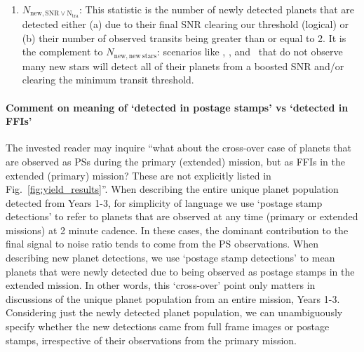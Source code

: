 \begin{enumerate}
	\item $N_\mathrm{new,SNR\lor N_{tra}}$:
	This statistic is the number of newly detected planets that are detected either (a) due to their final SNR clearing our threshold (logical) or (b) their number of observed transits being greater than or equal to 2.
	It is the complement to $N_\mathrm{new,new\ stars}$: scenarios like \nhemi, \npole, and \hemis\ that do not observe many new stars will detect all of their planets from a boosted SNR and/or clearing the minimum transit threshold.
	
\end{enumerate}

\paragraph{Comment on meaning of `detected in postage stamps' vs `detected in FFIs'}
The invested reader may inquire ``what about the cross-over case of planets that are observed as PSs during the primary (extended) mission, but as FFIs in the extended (primary) mission? These are not explicitly listed in Fig.~\ref{fig:yield_results}''.
When describing the entire unique planet population detected from Years 1-3, for simplicity of language we use `postage stamp detections' to refer to planets that are observed at any time (primary or extended missions) at 2 minute cadence.
In these cases, the dominant contribution to the final signal to noise ratio tends to come from the PS observations.
When describing new planet detections, we use `postage stamp detections' to mean planets that were newly detected due to being observed as postage stamps in the extended mission.
In other words, this `cross-over' point only matters in discussions of the unique planet population from an entire mission, Years 1-3.
Considering just the newly detected planet population, we can unambiguously specify whether the new detections came from full frame images or postage stamps, irrespective of their observations from the primary mission.
